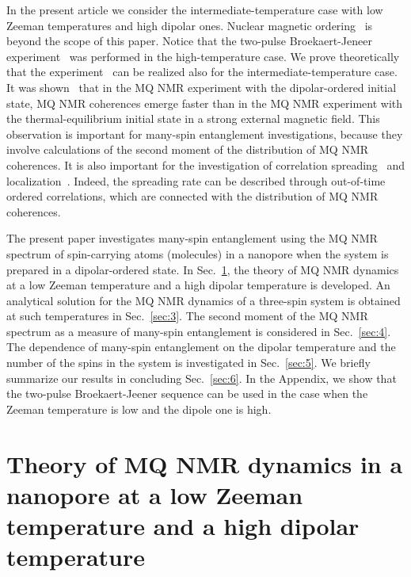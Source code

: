 \documentclass[review]{elsarticle}
\begin{document}
In the present article we consider the intermediate-temperature case with low Zeeman temperatures and high dipolar ones. 
Nuclear magnetic ordering~\cite{Abragam_1982} is beyond the scope of this paper.
Notice that the two-pulse Broekaert-Jeneer experiment~\cite{Jeener_1967} was performed in the high-temperature case.
We prove theoretically that the experiment~\cite{Jeener_1967} can be realized also for the intermediate-temperature case. 
It was shown~\cite{Doronin_2011} that in the MQ NMR experiment with the dipolar-ordered initial state, MQ NMR coherences emerge faster 
than in the MQ NMR experiment with the thermal-equilibrium initial state in a strong external magnetic field.
This observation is important for many-spin entanglement investigations, because they involve calculations of the second moment of the distribution of MQ NMR coherences. 
It is also important for the investigation of correlation spreading~\cite{Baugh_2001,Baum_1986,S_nchez_2014,Munowitz_1987} and localization~\cite{Alvarez_2015,Wei_2018}.
Indeed, the spreading rate can be described through out-of-time ordered correlations, which are connected with the distribution of MQ NMR coherences. 

The present paper investigates many-spin entanglement using the MQ NMR spectrum of spin-carrying atoms (molecules) in a nanopore when the system is prepared in a dipolar-ordered state.
In Sec.~\ref{sec:2}, the theory of MQ NMR dynamics at a low Zeeman temperature and a high dipolar temperature is developed.
An analytical solution for the MQ NMR dynamics of a three-spin system is obtained at such temperatures in Sec.~\ref{sec:3}.
The second moment of the MQ NMR spectrum as a measure of many-spin entanglement is considered in Sec.~\ref{sec:4}.
The dependence of many-spin entanglement on the dipolar temperature and the number of the spins in the system is investigated in Sec.~\ref{sec:5}.
We briefly summarize our results in concluding Sec.~\ref{sec:6}.
In the Appendix, we show that the two-pulse Broekaert-Jeener sequence can be used in the case when the Zeeman temperature is low and the dipole one is high.



\section{Theory of MQ NMR dynamics in a nanopore at a low Zeeman temperature and a high dipolar temperature}
\label{sec:2}
\end{document}
